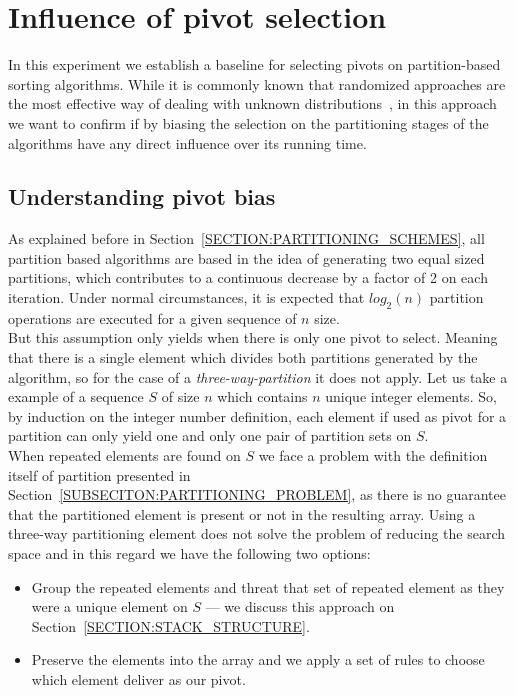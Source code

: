 \section{Influence of pivot selection}

In this experiment we establish a baseline for selecting pivots on partition-based sorting algorithms. While it is commonly known that randomized approaches are the most effective way of dealing with unknown distributions~\cite{estivil92}, in this approach we want to confirm if by biasing the selection on the partitioning stages of the algorithms have any direct influence over its running time.\\

\subsection{Understanding pivot bias}

As explained before in Section~\ref{SECTION:PARTITIONING_SCHEMES}, all partition based algorithms are based in the idea of generating two equal sized partitions, which contributes to a continuous decrease by a factor of 2 on each iteration. Under normal circumstances, it is expected that $log_2(n)$ partition operations are executed for a given sequence of $n$ size.\\

But this assumption only yields when there is only one pivot to select. Meaning that there is a single element which divides both partitions generated by the algorithm, so for the case of a \emph{three-way-partition} it does not apply. Let us take a example of a sequence $S$ of size $n$ which contains $n$ unique integer elements. So, by induction on the integer number definition, each element if used as pivot for a partition can only yield one and only one pair of partition sets on $S$.\\

When repeated elements are found on $S$ we face a problem with the definition itself of partition presented in Section~\ref{SUBSECITON:PARTITIONING_PROBLEM}, as there is no guarantee that the partitioned element is present or not in the resulting array. Using a three-way partitioning element does not solve the problem of reducing the search space and in this regard we have the following two options:

\begin{itemize}
    \item Group the repeated elements and threat that set of repeated element as they were a unique element on $S$ --- we discuss this approach on Section~\ref{SECTION:STACK_STRUCTURE}.
    \item Preserve the elements into the array and we apply a set of rules to choose which element deliver as our pivot.
\end{itemize}

